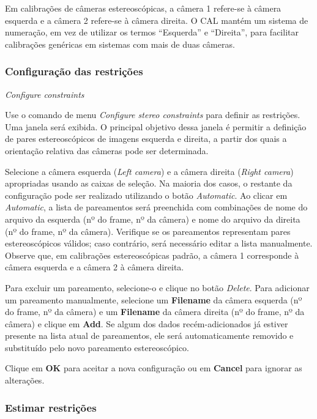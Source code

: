 \documentclass[
  12pt,
  letterpaper,
  DIV=11,
  numbers=noendperiod]{scrreprt}
\begin{document}
Em calibrações de câmeras estereoscópicas, a câmera 1 refere-se à câmera
esquerda e a câmera 2 refere-se à câmera direita. O CAL mantém um
sistema de numeração, em vez de utilizar os termos ``Esquerda'' e
``Direita'', para facilitar calibrações genéricas em sistemas com mais
de duas câmeras.

\subsubsection{\texorpdfstring{\textbf{Configuração das
restrições}}{Configuração das restrições}}\label{configurauxe7uxe3o-das-restriuxe7uxf5es}

\emph{Configure constraints}

Use o comando de menu \emph{Configure stereo constraints} para definir
as restrições. Uma janela será exibida. O principal objetivo dessa
janela é permitir a definição de pares estereoscópicos de imagens
esquerda e direita, a partir dos quais a orientação relativa das câmeras
pode ser determinada.

Selecione a câmera esquerda (\emph{Left camera}) e a câmera direita
(\emph{Right camera}) apropriadas usando as caixas de seleção. Na
maioria dos casos, o restante da configuração pode ser realizado
utilizando o botão \emph{Automatic}. Ao clicar em \emph{Automatic}, a
lista de pareamentos será preenchida com combinações de nome do arquivo
da esquerda (nº do frame, nº da câmera) e nome do arquivo da direita (nº
do frame, nº da câmera). Verifique se os pareamentos representam pares
estereoscópicos válidos; caso contrário, será necessário editar a lista
manualmente. Observe que, em calibrações estereoscópicas padrão, a
câmera 1 corresponde à câmera esquerda e a câmera 2 à câmera direita.

Para excluir um pareamento, selecione-o e clique no botão \emph{Delete}.
Para adicionar um pareamento manualmente, selecione um \textbf{Filename}
da câmera esquerda (nº do frame, nº da câmera) e um \textbf{Filename} da
câmera direita (nº do frame, nº da câmera) e clique em \textbf{Add}. Se
algum dos dados recém-adicionados já estiver presente na lista atual de
pareamentos, ele será automaticamente removido e substituído pelo novo
pareamento estereoscópico.

Clique em \textbf{OK} para aceitar a nova configuração ou em
\textbf{Cancel} para ignorar as alterações.

\subsubsection{\texorpdfstring{\textbf{Estimar
restrições}}{Estimar restrições}}\label{sec-estimate.constraint}
\end{document}
